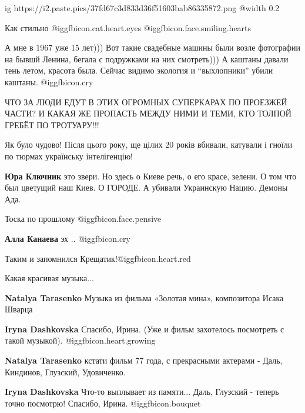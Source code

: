 \begin{itemize}
\ifcmt
  ig https://i2.paste.pics/37fd67c3d833d36f51603bab86335872.png
  @width 0.2
\fi

Как стильно  @igg{fbicon.cat.heart.eyes}  @igg{fbicon.face.smiling.hearts} 


А мне в 1967 уже 15 лет))) Вот такие свадебные машины были возле фотографии на
бывшй Ленина, бегала с подружками на них смотреть))) А каштаны давали тень
летом, красота была. Сейчас видимо экология и \enquote{выхлопники} убили каштаны. @igg{fbicon.cry} 


ЧТО ЗА ЛЮДИ ЕДУТ В ЭТИХ ОГРОМНЫХ СУПЕРКАРАХ ПО ПРОЕЗЖЕЙ ЧАСТИ?
И КАКАЯ ЖЕ ПРОПАСТЬ МЕЖДУ НИМИ И ТЕМИ, КТО ТОЛПОЙ ГРЕБЁТ ПО ТРОТУАРУ!!!

Як було чудово! Після цього року, ще цілих 20 років вбивали, катували і гноїли
по тюрмах українську інтелігенцію!

\begin{itemize} %
\textbf{Юра Ключник} это звери. Но здесь о Киеве речь, о его красе, зелени. О том что был цветущий наш Киев. О ГОРОДЕ. А убивали Украинскую Нацию. Демоны Ада.
\end{itemize} %

Тоска по прошлому @igg{fbicon.face.pensive} 

\textbf{Алла Канаева} эх .. @igg{fbicon.cry} 

Таким и запомнился Крещатик!@igg{fbicon.heart.red}

Какая красивая музыка...

\begin{itemize} %
\textbf{Natalya Tarasenko} Музыка из фильма «Золотая мина», композитора Исака Шварца

\textbf{Iryna Dashkovska} Спасибо, Ирина. (Уже и фильм захотелось посмотреть с такой музыкой).  @igg{fbicon.heart.growing} 

\textbf{Natalya Tarasenko} кстати фильм 77 года, с прекрасными актерами - Даль, Киндинов, Глузский, Удовиченко.

\textbf{Iryna Dashkovska} Что-то выплывает из памяти... Даль, Глузский - теперь точно посмотрю! Спасибо, Ирина. @igg{fbicon.bouquet} 
\end{itemize} %


\end{itemize}
